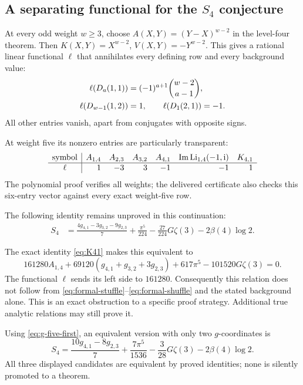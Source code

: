 \subsection{A separating functional for the \texorpdfstring{$S_4$}{S4} conjecture}

At every odd weight \(w\geq3\), choose
\(A(X,Y)=(Y-X)^{w-2}\) in the level-four theorem.
Then \(K(X,Y)=X^{w-2}\), \(V(X,Y)=-Y^{w-2}\).
This gives a rational linear functional \(\ell\) that annihilates every
defining row and every background value:
\begin{align}
 \ell(D_a(1,1))&=(-1)^{a+1}\binom{w-2}{a-1},\notag\\
 \ell(D_{w-1}(1,2))&=1,\qquad
 \ell(D_1(2,1))=-1. \label{eq:separating}
\end{align}
All other entries vanish, apart from conjugates with opposite signs.

At weight five its nonzero entries are particularly transparent:
\[
\begin{array}{c|rrrrrr}
 \text{symbol}&A_{1,4}&A_{2,3}&A_{3,2}&A_{4,1}
       &\operatorname{Im}\operatorname{Li}_{1,4}(-1,\mathrm{i})&K_{4,1}\\ \hline
 \ell&1&-3&3&-1&-1&1
\end{array}
\]
The polynomial proof verifies all weights; the delivered certificate
also checks this six-entry vector against every exact weight-five row.

\begin{conjecture}\label{conj:S4}
The following identity remains unproved in this continuation:
\begin{align}
 S_4&=\frac{4g_{4,1}-3g_{3,2}-9g_{2,3}}7
       +\frac{\pi^5}{224}-\frac{27}{224}G\zeta(3)
       -2\beta(4)\log2. \label{eq:S4-original}
\end{align}
\end{conjecture}

The exact identity \eqref{eq:K41} makes this equivalent to
\begin{equation}\label{eq:S4-A}
 161280A_{1,4}+69120(g_{4,1}+g_{3,2}+3g_{2,3})
       +617\pi^5-101520G\zeta(3)=0.
\end{equation}
The functional \(\ell\) sends its left side to \(161280\).
Consequently this relation does not follow from
\eqref{eq:formal-stuffle}--\eqref{eq:formal-shuffle} and the stated
background alone. This is an exact obstruction to a specific proof
strategy. Additional true analytic relations may still prove it.

Using \eqref{eq:g-five-first}, an equivalent version with only two
\(g\)-coordinates is
\begin{equation}\label{eq:S4-two}
 S_4=\frac{10g_{4,1}-8g_{2,3}}7
       +\frac{7\pi^5}{1536}-\frac3{28}G\zeta(3)
       -2\beta(4)\log2.
\end{equation}
All three displayed candidates are equivalent by proved identities;
none is silently promoted to a theorem.


